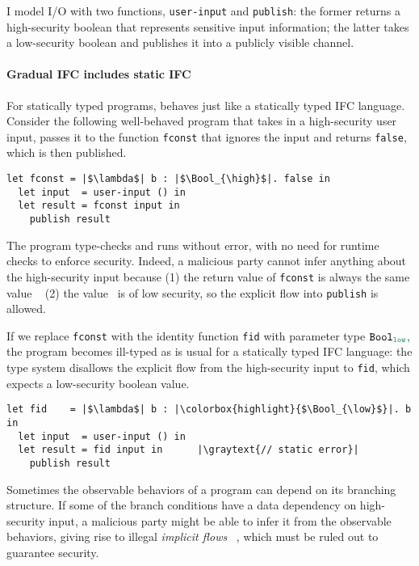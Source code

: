I model I/O with two functions, \texttt{user-input} and \texttt{publish}: the
former returns a high-security boolean that represents sensitive input
information; the latter takes a low-security boolean and publishes it into a
publicly visible channel.

\paragraph{Gradual IFC includes static IFC}

For statically typed programs, \Surface behaves just like a statically
typed IFC language. Consider the following well-behaved \Surface
program that takes in a high-security user input, passes it to the
function \texttt{fconst} that ignores the input and
returns \texttt{false}, which is then published.

\begin{lstlisting}[style=tt]
  let fconst = |$\lambda$| b : |$\Bool_{\high}$|. false in
  let input  = user-input () in
  let result = fconst input in
    publish result
\end{lstlisting}

The program type-checks and runs without error, with no need for
runtime checks to enforce security. Indeed, a malicious party cannot
infer anything about the high-security input because (1) the return
value of \texttt{fconst} is always the same value \false~ (2)
the value \false~is of low security, so the explicit flow
into \texttt{publish} is allowed.

If we replace \texttt{fconst} with the identity function \texttt{fid} with
parameter type $\Bool_{\low}$, the program becomes ill-typed as is usual for a
statically typed IFC language: the type system disallows the explicit flow from
the high-security input to \texttt{fid}, which expects a low-security boolean
value.

\begin{lstlisting}[style=tt]
  let fid    = |$\lambda$| b : |\colorbox{highlight}{$\Bool_{\low}$}|. b in
  let input  = user-input () in
  let result = fid input in      |\graytext{// static error}|
    publish result
\end{lstlisting}

Sometimes the observable behaviors of a program can depend on its branching
structure. If some of the branch conditions have a data dependency on
high-security input, a malicious party might be able to infer it from the
observable behaviors, giving rise to illegal \textit{implicit flows}
~\parencite{denning1976lattice}, which must be ruled out to guarantee security.

